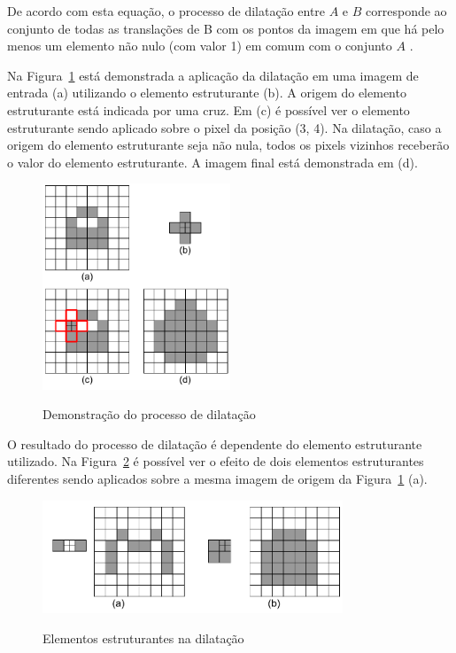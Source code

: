 \documentclass[12pt,oneside,a4paper,english,french,spanish,brazil,]{abntex2}
\begin{document}
De acordo com esta equação, o processo de dilatação entre \(A\) e \(B\) corresponde ao conjunto de todas as translações de B com os pontos da imagem em que há pelo menos um elemento não nulo (com valor 1) em comum com o conjunto \(A\) \cite{pedrini:2008}. 

Na Figura~\ref{fig:PDI_Dilatacao_1} está demonstrada a aplicação da dilatação em uma imagem de entrada (a) utilizando o elemento estruturante (b). A origem do elemento estruturante está indicada por uma cruz. Em (c) é possível ver o elemento estruturante sendo aplicado sobre o pixel da posição (3, 4). Na dilatação, caso a origem do elemento estruturante seja não nula, todos os pixels vizinhos receberão o valor do elemento estruturante. A imagem final está demonstrada em (d).

\begin{figure}[ht]
\centering
\caption{Demonstração do processo de dilatação}
\includegraphics[width=0.5\textwidth]{imagens/PDI_Dilatacao_1.pdf}
\sourceAuthor
\label{fig:PDI_Dilatacao_1}
\end{figure}

O resultado do processo de dilatação é dependente do elemento estruturante utilizado. Na Figura~\ref{fig:PDI_Dilatacao_2} é possível ver o efeito de dois elementos estruturantes diferentes sendo aplicados sobre a mesma imagem de origem da Figura~\ref{fig:PDI_Dilatacao_1} (a).

\begin{figure}[ht]
\centering
\caption{Elementos estruturantes na dilatação}
\includegraphics[width=0.8\textwidth]{imagens/PDI_Dilatacao_2.pdf}
\sourceAuthor
\label{fig:PDI_Dilatacao_2}
\end{figure}
\end{document}
